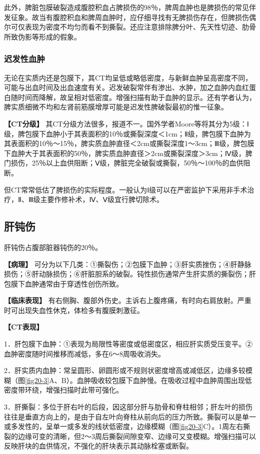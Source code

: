 此外，脾脏包膜破裂造成腹腔积血占脾损伤的98％，脾周血肿也是脾损伤的常见伴发征象。故当有腹腔积血和脾周血肿时，应仔细寻找有无脾损伤存在，但脾损伤偶尔可仅表现为密度不均匀而看不到撕裂。还应注意排除脾分叶、先天性切迹、肋骨所致伪影等形成的假象。

\subsubsection{迟发性血肿}

无论在实质内还是包膜下，其CT均呈低或略低密度，与新鲜血肿呈高密度不同，可能与出血时间及出血速度有关。迟发破裂常伴有渗出、水肿，加之血肿内血红蛋白随时间而降解，故呈相对低密度。增强扫描有助于血肿的显示。还有学者认为，脾实质细微不均和左肾前筋膜增厚可能是迟发性脾破裂最初的惟一征象。

\textbf{【CT分级】}
其CT分级方法很多，报道不一。国外学者Moore等将其分为5级：Ⅰ级，脾包膜下血肿小于其表面积的10％或撕裂深度＜1cm；Ⅱ级，脾包膜下血肿为其表面积的10％～15％，脾实质血肿直径＜2cm或撕裂深度1～3cm；Ⅲ级，脾包膜下血肿大于其表面积的50％，脾实质血肿直径＞2cm或撕裂深度＞3cm；Ⅳ级，脾门损伤，25％以上血供阻断；Ⅴ级，脾脏完全破裂或撕裂，50％～100％的血供阻断。

但CT常常低估了脾损伤的实际程度。一般认为Ⅰ级可以在严密监护下采用非手术治疗，Ⅱ、Ⅲ级主要作修补术，Ⅳ、Ⅴ级宜行脾切除术。

\subsection{肝钝伤}

肝钝伤占腹部脏器钝伤的20％。

\textbf{【病理】}
可分为以下几类：①撕裂伤；②包膜下血肿；③肝实质挫伤；④肝静脉损伤；⑤肝动脉损伤；⑥肝脏胆系的破裂。钝性损伤通常产生肝实质的撕裂伤；肝包膜下血肿通常由于穿透性创伤所致。

\textbf{【临床表现】}
有右侧胸、腹部外伤史。主诉右上腹疼痛，有时向右肩放射。严重时可出现失血性休克，体检多有腹膜刺激征。

\textbf{【CT表现】}

1．肝包膜下血肿：①表现为局限性等密度或低密度区，相应肝实质受压变平。②血肿密度随时间推移而减低，多在6～8周吸收消失。

2．肝实质内血肿：常呈圆形、卵圆形或不规则状密度增高或减低区，边缘多较模糊（图\ref{fig20-3}A、B）。血肿吸收较包膜下血肿慢。在吸收过程中血肿周围出现低密度带环绕，增强扫描时此带可强化。

3．肝撕裂：多位于肝右叶的后段，因这部分肝与肋骨和脊柱相邻；肝左叶的损伤往往是垂直方向上的，是由于自左叶向脊柱从前向后的压力所致。撕裂可以是单一或多发性的，呈单一或多发的线状低密度，边缘模糊（图\ref{fig20-3}C）。1周左右撕裂的边缘可变的清晰，但2～3周后撕裂间隙变窄、边缘可又变模糊。增强扫描可以反映肝块的血供情况，不强化的肝块表示其动脉栓塞或断裂。

